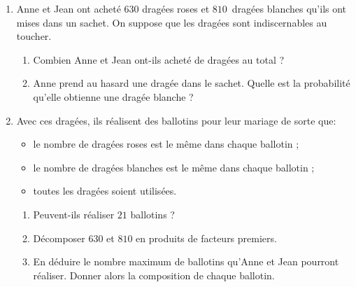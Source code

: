 \documentclass[exercice,a4]{thedocument}%
\begin{document}
%

\medskip

\begin{enumerate}
\item Anne et Jean ont acheté $630$ dragées roses et $810$~dragées blanches qu'ils ont mises dans un sachet. On suppose que les dragées sont indiscernables au toucher.
	\begin{enumerate}
		\item Combien Anne et Jean ont-ils acheté de dragées au total ?
		\item Anne prend au hasard une dragée dans le sachet. Quelle est la probabilité qu'elle
obtienne une dragée blanche ?
	\end{enumerate}
\item Avec ces dragées, ils réalisent des ballotins pour leur mariage de sorte que: 
\begin{itemize}
\item le nombre de dragées roses est le même dans chaque ballotin ;
\item le nombre de dragées blanches est le même dans chaque ballotin ;
\item toutes les dragées soient utilisées.
\end{itemize}

	\begin{enumerate}
		\item Peuvent-ils réaliser $21$ ballotins ?
		\item Décomposer $630$ et $810$ en produits de facteurs premiers.
		\item En déduire le nombre maximum de ballotins qu'Anne et Jean pourront réaliser.
Donner alors la composition de chaque ballotin.
	\end{enumerate}
\end{enumerate}

\bigskip
\showthesource
\end{document}
